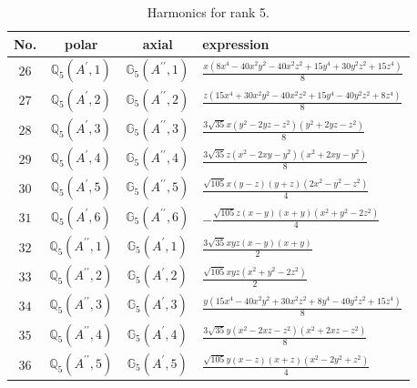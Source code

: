 \documentclass[fleqn,8pt,landscape]{jsarticle}
\begin{document}
\begin{table}[ht!]
\begin{center}
\caption{Harmonics for rank 5.}
\renewcommand{\arraystretch}{1.3}
\begin{tabular}{cccl} \hline \hline
No. & polar & axial & expression \\ \hline
$ 26 $ & $ \mathbb{Q}_{5}(A^{\prime},1) $ & $ \mathbb{G}_{5}(A^{\prime\prime},1) $ & $ \frac{x \left(8 x^{4} - 40 x^{2} y^{2} - 40 x^{2} z^{2} + 15 y^{4} + 30 y^{2} z^{2} + 15 z^{4}\right)}{8} $ \\
$ 27 $ & $ \mathbb{Q}_{5}(A^{\prime},2) $ & $ \mathbb{G}_{5}(A^{\prime\prime},2) $ & $ \frac{z \left(15 x^{4} + 30 x^{2} y^{2} - 40 x^{2} z^{2} + 15 y^{4} - 40 y^{2} z^{2} + 8 z^{4}\right)}{8} $ \\
$ 28 $ & $ \mathbb{Q}_{5}(A^{\prime},3) $ & $ \mathbb{G}_{5}(A^{\prime\prime},3) $ & $ \frac{3 \sqrt{35} x \left(y^{2} - 2 y z - z^{2}\right) \left(y^{2} + 2 y z - z^{2}\right)}{8} $ \\
$ 29 $ & $ \mathbb{Q}_{5}(A^{\prime},4) $ & $ \mathbb{G}_{5}(A^{\prime\prime},4) $ & $ \frac{3 \sqrt{35} z \left(x^{2} - 2 x y - y^{2}\right) \left(x^{2} + 2 x y - y^{2}\right)}{8} $ \\
$ 30 $ & $ \mathbb{Q}_{5}(A^{\prime},5) $ & $ \mathbb{G}_{5}(A^{\prime\prime},5) $ & $ \frac{\sqrt{105} x \left(y - z\right) \left(y + z\right) \left(2 x^{2} - y^{2} - z^{2}\right)}{4} $ \\
$ 31 $ & $ \mathbb{Q}_{5}(A^{\prime},6) $ & $ \mathbb{G}_{5}(A^{\prime\prime},6) $ & $ - \frac{\sqrt{105} z \left(x - y\right) \left(x + y\right) \left(x^{2} + y^{2} - 2 z^{2}\right)}{4} $ \\
$ 32 $ & $ \mathbb{Q}_{5}(A^{\prime\prime},1) $ & $ \mathbb{G}_{5}(A^{\prime},1) $ & $ \frac{3 \sqrt{35} x y z \left(x - y\right) \left(x + y\right)}{2} $ \\
$ 33 $ & $ \mathbb{Q}_{5}(A^{\prime\prime},2) $ & $ \mathbb{G}_{5}(A^{\prime},2) $ & $ \frac{\sqrt{105} x y z \left(x^{2} + y^{2} - 2 z^{2}\right)}{2} $ \\
$ 34 $ & $ \mathbb{Q}_{5}(A^{\prime\prime},3) $ & $ \mathbb{G}_{5}(A^{\prime},3) $ & $ \frac{y \left(15 x^{4} - 40 x^{2} y^{2} + 30 x^{2} z^{2} + 8 y^{4} - 40 y^{2} z^{2} + 15 z^{4}\right)}{8} $ \\
$ 35 $ & $ \mathbb{Q}_{5}(A^{\prime\prime},4) $ & $ \mathbb{G}_{5}(A^{\prime},4) $ & $ \frac{3 \sqrt{35} y \left(x^{2} - 2 x z - z^{2}\right) \left(x^{2} + 2 x z - z^{2}\right)}{8} $ \\
$ 36 $ & $ \mathbb{Q}_{5}(A^{\prime\prime},5) $ & $ \mathbb{G}_{5}(A^{\prime},5) $ & $ \frac{\sqrt{105} y \left(x - z\right) \left(x + z\right) \left(x^{2} - 2 y^{2} + z^{2}\right)}{4} $ \\
 \hline \hline
\end{tabular}
\end{center}
\end{table}
\end{document}
